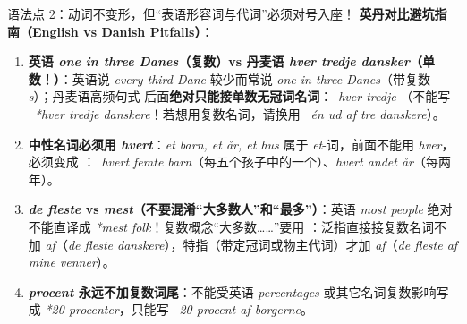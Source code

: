 \begin{grammatikbox}{语法点 2：动词不变形，但“表语形容词与代词”必须对号入座！}
\vspace{0.3em}
\textbf{英丹对比避坑指南（English vs Danish Pitfalls）}：
\begin{enumerate}
  \item \textbf{英语 \textit{one in three Danes}（复数）vs 丹麦语 \textit{hver tredje dansker}（单数！）}：英语说 \textit{every third Dane} 较少而常说 \textit{one in three Danes}（带复数 \textit{-s}）；丹麦语高频句式  后面\textbf{绝对只能接单数无冠词名词}：\ \textit{hver tredje }（不能写 \ \textit{*hver tredje danskere}！若想用复数名词，请换用 \ \textit{én ud af tre danskere}）。
  \item \textbf{中性名词必须用 \textit{hvert}}：\textit{et barn, et år, et hus} 属于 \textit{et}-词，前面不能用 \textit{hver}，必须变成 ：\ \textit{hvert femte barn}（每五个孩子中的一个）、\textit{hvert andet år}（每两年）。
  \item \textbf{\textit{de fleste} vs \textit{mest}（不要混淆“大多数人”和“最多”）}：英语 \textit{most people} 绝对不能直译成 \textit{*mest folk}！复数概念“大多数……”要用 ：泛指直接接复数名词不加 \textit{af}（\textit{de fleste danskere}），特指（带定冠词或物主代词）才加 \textit{af}（\textit{de fleste af mine venner}）。
  \item \textbf{\textit{procent} 永远不加复数词尾}：不能受英语 \textit{percentages} 或其它名词复数影响写成 \textit{*20 procenter}，只能写 \ \textit{20 procent af borgerne}。
\end{enumerate}
\end{grammatikbox}


